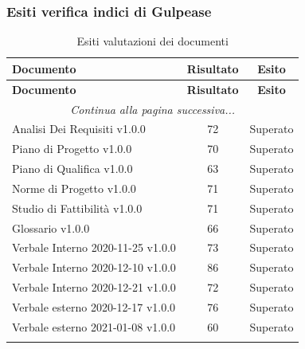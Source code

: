 \documentclass[../piano_di_qualifica.tex]{subfiles}
\begin{document}
\subsubsection{Esiti verifica indici di Gulpease}
\label{sub:verif_gul}

\begin{center}
	\begin{longtable}{|l|c|c|}
		\hline
		\rowcolor{lightgray}
		\textbf{Documento}                 & \textbf{Risultato} & \textbf{Esito} \\
		\hline
		\endfirsthead
	
		\hline
		\rowcolor{lightgray}
		\textbf{Documento}                 & \textbf{Risultato} & \textbf{Esito} \\
		\hline
		\endhead
		
		\hline
		\multicolumn{3}{|c|}{\emph{Continua alla pagina successiva...}}\\
		\hline
		\endfoot

		\endlastfoot

		Analisi Dei Requisiti v1.0.0       & 72                 & Superato       \\
		Piano di Progetto v1.0.0           & 70                 & Superato       \\
		Piano di Qualifica v1.0.0          & 63                 & Superato       \\
		Norme di Progetto v1.0.0           & 71                 & Superato       \\
		Studio di Fattibilità v1.0.0       & 71                 & Superato       \\
		Glossario v1.0.0                   & 66                 & Superato       \\
		Verbale Interno 2020-11-25 v1.0.0  & 73                 & Superato       \\
		Verbale Interno 2020-12-10 v1.0.0  & 86                 & Superato       \\
		Verbale Interno 2020-12-21 v1.0.0  & 72                 & Superato       \\
		Verbale esterno 2020-12-17  v1.0.0 & 76                 & Superato       \\
		Verbale esterno 2021-01-08  v1.0.0 & 60                 & Superato       \\
		\hline
		\caption{Esiti valutazioni dei documenti}
	\end{longtable}
\end{center}
\end{document}

